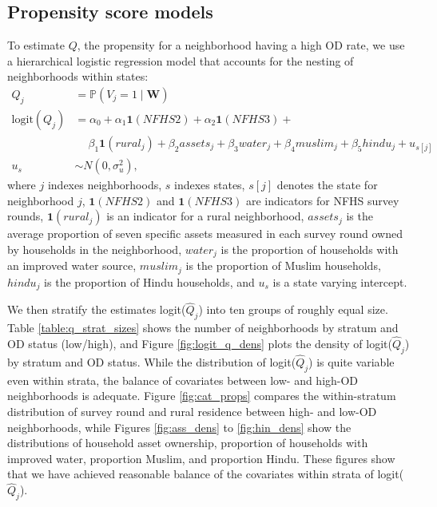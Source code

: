 \documentclass[12pt,a4paper,titlepage]{article}
\begin{document}
\begin{appendices}
\section{Propensity score models}\label{sec:ps_models}
To estimate $Q$, the propensity for a neighborhood having a high OD rate, we use a hierarchical logistic regression model that accounts for the nesting of neighborhoods within states:
\begin{align*}
	Q_j &= \mathbb{P}(V_j = 1 \mid \mathbf{W}) \\
	\text{logit}(Q_j) &= \alpha_0 + \alpha_1 \mathbf{1}(NFHS2) + \alpha_2 \mathbf{1}(NFHS3) + \\
	&\quad~ \beta_1 \mathbf{1}(rural_j) + \beta_2 assets_j + \beta_3 water_j + \beta_4 muslim_j + \beta_5 hindu_j + u_{s[j]} \\
	u_s &\sim N(0, \sigma_u^2),
\end{align*}
where $j$ indexes neighborhoods, $s$ indexes states, $s[j]$ denotes the state for neighborhood $j$, $\mathbf{1}(NFHS2)$ and $\mathbf{1}(NFHS3)$ are indicators for NFHS survey rounds, $\mathbf{1}(rural_j)$ is an indicator for a rural neighborhood, $assets_j$ is the average proportion of seven specific assets measured in each survey round owned by households in the neighborhood, $water_j$ is the proportion of households with an improved water source, $muslim_j$ is the proportion of Muslim households, $hindu_j$ is the proportion of Hindu households, and $u_s$ is a state varying intercept.

We then stratify the estimates logit($\widehat{Q}_j$) into ten groups of roughly equal size. Table \ref{table:q_strat_sizes} shows the number of neighborhoods by stratum and OD status (low/high), and Figure \ref{fig:logit_q_dens} plots the density of logit($\widehat{Q}_j$) by stratum and OD status. While the distribution of logit($\widehat{Q}_j$) is quite variable even within strata, the balance of covariates between low- and high-OD neighborhoods is adequate. Figure \ref{fig:cat_props} compares the within-stratum distribution of survey round and rural residence between high- and low-OD neighborhoods, while Figures \ref{fig:ass_dens} to \ref{fig:hin_dens} show the distributions of household asset ownership, proportion of households with improved water, proportion Muslim, and proportion Hindu. These figures show that we have achieved reasonable balance of the covariates within strata of logit($\widehat{Q}_j$).


\end{appendices}
\end{document}
